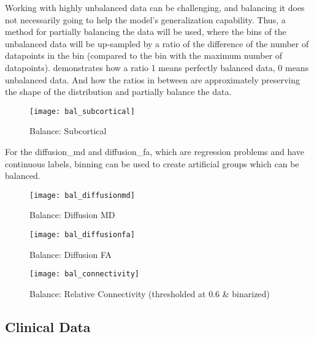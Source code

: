 Working with highly unbalanced data can be challenging, and balancing it does not necessarily going to help the model's generalization capability. Thus, a method for partially balancing the data will be used, where the bins of the unbalanced data will be up-sampled by a ratio of the difference of the number of datapoints in the bin (compared to the bin with the maximum number of datapoints).  demonstrates how a ratio 1 means perfectly balanced data, 0 means unbalanced data. And how the ratios in between are approximately preserving the shape of the distribution and partially balance the data.

\begin{figure}[H]
\centering
\texttt{[image: bal\_subcortical]}
\caption{Balance: Subcortical}
\label{fig:bal_sub}
\end{figure}

For the diffusion\_md and diffusion\_fa, which are regression problems and have continuous labels, binning can be used to create artificial groups which can be balanced.

\begin{figure}[H]
\centering
\texttt{[image: bal\_diffusionmd]}
\caption{Balance: Diffusion MD}
\end{figure}

\begin{figure}[H]
\centering
\texttt{[image: bal\_diffusionfa]}
\caption{Balance: Diffusion FA}
\end{figure}

\begin{figure}[H]
\centering
\texttt{[image: bal\_connectivity]}
\caption{Balance: Relative Connectivity (thresholded at $0.6$ \& binarized)}
\end{figure}

\subsection{Clinical Data}
\label{sec:clinical}

